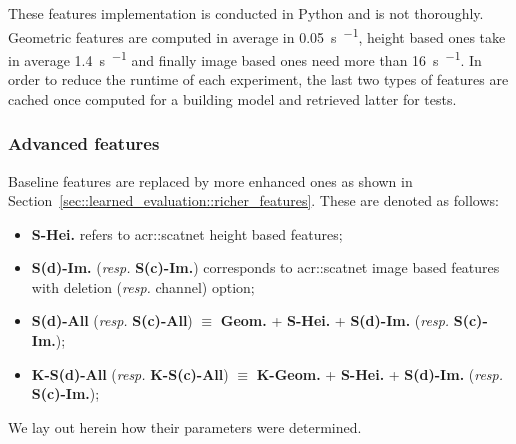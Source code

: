             These features implementation is conducted in Python and is not thoroughly.
            Geometric features are computed in average in \SI{0.05}{\s \per \building}, height based ones take in average \SI{1.4}{\s \per \building} and finally image based ones need more than \SI{16}{\s \per \building}.
            In order to reduce the runtime of each experiment, the last two types of features are cached once computed for a building model and retrieved latter for tests.

        \subsubsection{Advanced features}
            Baseline features are replaced by more enhanced ones as shown in Section~\ref{sec::learned_evaluation::richer_features}.
            These are denoted as follows:
            \begin{itemize}[label=\(\blacktriangleright\)]
                \item \textbf{S-Hei.} refers to \gls{acr::scatnet} height based features;
                \item \textbf{S(d)-Im.} (\textit{resp.} \textbf{S(c)-Im.}) corresponds to \gls{acr::scatnet} image based features with deletion (\textit{resp.} channel) option;
                \item \textbf{S(d)-All} (\textit{resp.} \textbf{S(c)-All}) \(\equiv\) \textbf{Geom.} + \textbf{S-Hei.} + \textbf{S(d)-Im.} (\textit{resp.} \textbf{S(c)-Im.});
                \item \textbf{K-S(d)-All} (\textit{resp.} \textbf{K-S(c)-All}) \(\equiv\) \textbf{K-Geom.} + \textbf{S-Hei.} + \textbf{S(d)-Im.} (\textit{resp.} \textbf{S(c)-Im.});
            \end{itemize}
            We lay out herein how their parameters were determined.

